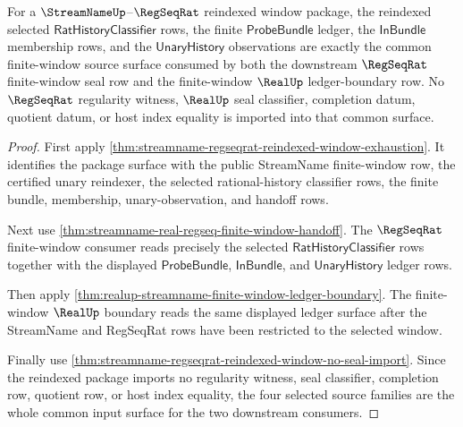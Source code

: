 \begin{theorem}
\label{thm:streamname-regseqrat-reindexed-window-selected-classifier-handoff}
For a $\StreamNameUp$--$\RegSeqRat$ reindexed window package, the reindexed
selected $\mathsf{RatHistoryClassifier}$ rows, the finite
$\mathsf{ProbeBundle}$ ledger, the $\mathsf{InBundle}$ membership rows, and the
$\mathsf{UnaryHistory}$ observations are exactly the common finite-window source
surface consumed by both the downstream $\RegSeqRat$ finite-window seal row and
the finite-window $\RealUp$ ledger-boundary row. No $\RegSeqRat$ regularity
witness, $\RealUp$ seal classifier, completion datum, quotient datum, or host
index equality is imported into that common surface.
\end{theorem}
\begin{proof}
First apply
\autoref{thm:streamname-regseqrat-reindexed-window-exhaustion}. It identifies
the package surface with the public StreamName finite-window row, the certified
unary reindexer, the selected rational-history classifier rows, the finite
bundle, membership, unary-observation, and handoff rows.

Next use \autoref{thm:streamname-real-regseq-finite-window-handoff}. The
$\RegSeqRat$ finite-window consumer reads precisely the selected
$\mathsf{RatHistoryClassifier}$ rows together with the displayed
$\mathsf{ProbeBundle}$, $\mathsf{InBundle}$, and $\mathsf{UnaryHistory}$ ledger
rows.

Then apply \autoref{thm:realup-streamname-finite-window-ledger-boundary}. The
finite-window $\RealUp$ boundary reads the same displayed ledger surface after
the StreamName and RegSeqRat rows have been restricted to the selected window.

Finally use
\autoref{thm:streamname-regseqrat-reindexed-window-no-seal-import}. Since the
reindexed package imports no regularity witness, seal classifier, completion
row, quotient row, or host index equality, the four selected source families are
the whole common input surface for the two downstream consumers.
\end{proof}

